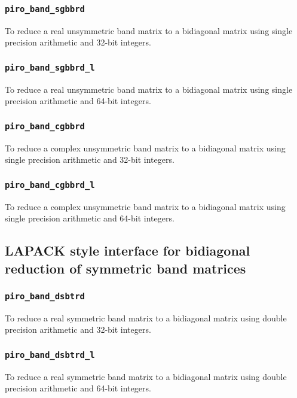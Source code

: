 \documentclass[11pt]{article}
\begin{document}
\subsubsection{{\tt piro\_band\_sgbbrd}}

To reduce a real unsymmetric band matrix to a bidiagonal matrix using single 
precision arithmetic and 32-bit integers.

\subsubsection{{\tt piro\_band\_sgbbrd\_l}}

To reduce a real unsymmetric band matrix to a bidiagonal matrix using single 
precision arithmetic and 64-bit integers.

\subsubsection{{\tt piro\_band\_cgbbrd}}

To reduce a complex unsymmetric band matrix to a bidiagonal matrix using single 
precision arithmetic and 32-bit integers.

\subsubsection{{\tt piro\_band\_cgbbrd\_l}}

To reduce a complex unsymmetric band matrix to a bidiagonal matrix using single 
precision arithmetic and 64-bit integers.

\subsection{LAPACK style interface for bidiagonal reduction of symmetric band matrices}

\subsubsection{{\tt piro\_band\_dsbtrd}}

To reduce a real symmetric band matrix to a bidiagonal matrix using double 
precision arithmetic and 32-bit integers.

\subsubsection{{\tt piro\_band\_dsbtrd\_l}}

To reduce a real symmetric band matrix to a bidiagonal matrix using double 
precision arithmetic and 64-bit integers.
\end{document}
